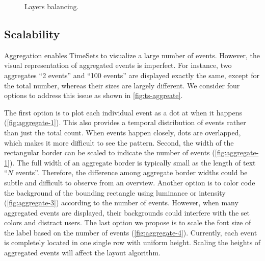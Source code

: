 \begin{figure}[!htb]
	\centering
	\hfill
	\caption{Layers balancing.}
	\label{fig:balancing}
\end{figure}

\subsection{Scalability}
\label{sub:ts-scalability}
Aggregation enables TimeSets to visualize a large number of events. However, the visual representation of aggregated events is imperfect. For instance, two aggregates ``2 events'' and ``100 events'' are displayed exactly the same, except for the total number, whereas their sizes are largely different. We consider four options to address this issue as shown in \autoref{fig:ts-aggreate}.

The first option is to plot each individual event as a dot at when it happens (\autoref{fig:aggregate-1}). This also provides a temporal distribution of events rather than just the total count. When events happen closely, dots are overlapped, which makes it more difficult to see the pattern. Second, the width of the rectangular border can be scaled to indicate the number of events (\autoref{fig:aggregate-1}). The full width of an aggregate border is typically small as the length of text ``$N$ events''. Therefore, the difference among aggregate border widths could be subtle and difficult to observe from an overview. Another option is to color code the background of the bounding rectangle using luminance or intensity (\autoref{fig:aggregate-3}) according to the number of events. However, when many aggregated events are displayed, their backgrounds could interfere with the set colors and distract users. The last option we propose is to scale the font size of the label based on the number of events (\autoref{fig:aggregate-4}). Currently, each event is completely located in one single row with uniform height. Scaling the heights of aggregated events will affect the layout algorithm.

